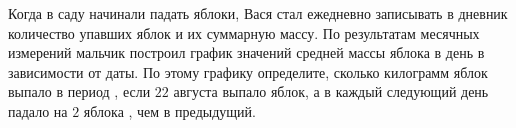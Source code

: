 Когда в саду начинали падать яблоки, Вася стал ежедневно записывать в дневник количество упавших яблок и их суммарную массу. По результатам месячных измерений мальчик построил график значений средней массы яблока в день в зависимости от даты. По этому графику определите, сколько килограмм яблок выпало в период , если $22$ августа выпало  яблок, а в каждый следующий день падало на $2$ яблока , чем в предыдущий.